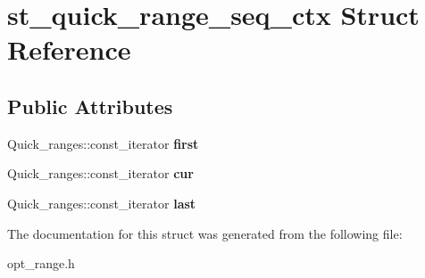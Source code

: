 \hypertarget{structst__quick__range__seq__ctx}{}\section{st\+\_\+quick\+\_\+range\+\_\+seq\+\_\+ctx Struct Reference}
\label{structst__quick__range__seq__ctx}
\subsection*{Public Attributes}
\begin{DoxyCompactItemize}
\item 
\mbox{\label{structst__quick__range__seq__ctx_ac1f67b474d12463240119609e41b156d}} 
Quick\+\_\+ranges\+::const\+\_\+iterator {\bfseries first}
\item 
\mbox{\label{structst__quick__range__seq__ctx_a0a8d56c36c0cdf036756ba133eec5b00}} 
Quick\+\_\+ranges\+::const\+\_\+iterator {\bfseries cur}
\item 
\mbox{\label{structst__quick__range__seq__ctx_aab09e522413ff5bf903714469c8aa9b9}} 
Quick\+\_\+ranges\+::const\+\_\+iterator {\bfseries last}
\end{DoxyCompactItemize}


The documentation for this struct was generated from the following file\+:\begin{DoxyCompactItemize}
\item 
opt\+\_\+range.\+h\end{DoxyCompactItemize}
